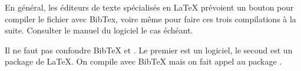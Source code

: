En général, les éditeurs de texte spécialisés en \LaTeX{} prévoient un bouton pour compiler le fichier  avec BibTex, voire même pour faire ces trois compilations à la suite. Consulter le manuel du logiciel le cas échéant.

\begin{attention}
Il ne faut pas confondre BibTeX et . Le premier est un logiciel, le second est un package de \LaTeX{}.
On compile avec BibTeX mais on fait appel au package .
\end{attention}





